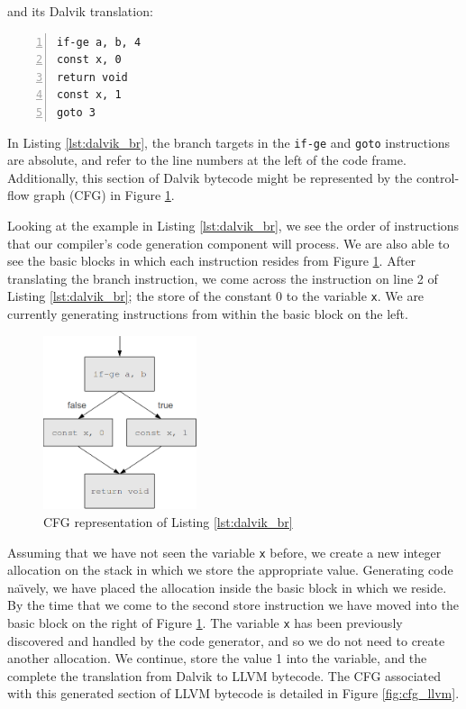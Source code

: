 and its Dalvik translation:

\lstset{
	language=Assembly,
	basicstyle=\small,
	stringstyle=\ttfamily
}

\begin{lstlisting}[frame=single, numbers=left, numberstyle=\tiny, caption={Dalvik code}, label=lst:dalvik_br]
if-ge a, b, 4
const x, 0
return void
const x, 1
goto 3
\end{lstlisting}

In Listing \ref{lst:dalvik_br}, the branch targets in the \verb|if-ge| and \verb|goto| instructions are absolute, and refer to the line numbers at the left of the code frame. Additionally, this section of Dalvik bytecode might be represented by the control-flow graph (CFG) in Figure \ref{fig:cfg_dalvik}.

Looking at the example in Listing \ref{lst:dalvik_br}, we see the order of instructions that our compiler's code generation component will process. We are also able to see the basic blocks in which each instruction resides from Figure \ref{fig:cfg_dalvik}. After translating the branch instruction, we come across the instruction on line 2 of Listing \ref{lst:dalvik_br}; the store of the constant 0 to the variable \verb|x|. We are currently generating instructions from within the basic block on the left.

\begin{figure}[h!]
    \centering
    \includegraphics[width=0.4\textwidth]{images/cfg_dalvik.png}
    \caption{CFG representation of Listing \ref{lst:dalvik_br}}
    \label{fig:cfg_dalvik}
\end{figure}

Assuming that we have not seen the variable \verb|x| before, we create a new integer allocation on the stack in which we store the appropriate value. Generating code na\"{\i}vely, we have placed the allocation inside the basic block in which we reside. By the time that we come to the second store instruction we have moved into the basic block on the right of Figure \ref{fig:cfg_dalvik}. The variable \verb|x| has been previously discovered and handled by the code generator, and so we do not need to create another allocation. We continue, store the value 1 into the variable, and the complete the translation from Dalvik to LLVM bytecode. The CFG associated with this generated section of LLVM bytecode is detailed in Figure \ref{fig:cfg_llvm}.

